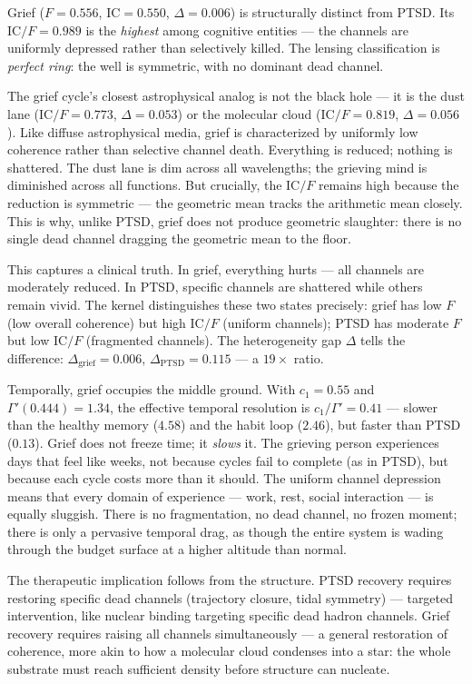 \documentclass[
  aps,
  prd,
  twocolumn,
  superscriptaddress,
  nofootinbib,
  floatfix
]{revtex4-2}
\newcommand{\Gam}{\Gamma}
\newcommand{\IC}{\mathrm{IC}}
\begin{document}
Grief ($F = 0.556$, $\IC = 0.550$, $\Delta = 0.006$) is
structurally distinct from PTSD.  Its $\IC/F = 0.989$ is
the \emph{highest} among cognitive entities --- the channels
are uniformly depressed rather than selectively killed.
The lensing classification is \emph{perfect ring}: the well
is symmetric, with no dominant dead channel.

The grief cycle's closest astrophysical analog is not
the black hole --- it is the dust lane ($\IC/F = 0.773$,
$\Delta = 0.053$) or the molecular cloud ($\IC/F = 0.819$,
$\Delta = 0.056$).  Like diffuse astrophysical media, grief
is characterized by uniformly low coherence rather than
selective channel death.  Everything is reduced;
nothing is shattered.  The dust lane is dim across all
wavelengths; the grieving mind is diminished across all functions.
But crucially, the $\IC/F$ remains high because the
reduction is symmetric --- the geometric mean tracks the
arithmetic mean closely.  This is why, unlike PTSD, grief
does not produce geometric slaughter: there is no single
dead channel dragging the geometric mean to the floor.

This captures a clinical truth.  In grief, everything hurts
--- all channels are moderately reduced.  In PTSD, specific
channels are shattered while others remain vivid.  The kernel
distinguishes these two states precisely: grief has low $F$
(low overall coherence) but high $\IC/F$ (uniform channels);
PTSD has moderate $F$ but low $\IC/F$ (fragmented channels).
The heterogeneity gap $\Delta$ tells the difference:
$\Delta_{\text{grief}} = 0.006$,
$\Delta_{\text{PTSD}} = 0.115$ --- a $19\times$ ratio.

Temporally, grief occupies the middle ground.  With $c_1 =
0.55$ and $\Gam'(0.444) = 1.34$, the effective temporal
resolution is $c_1/\Gam' = 0.41$ --- slower than the healthy
memory ($4.58$) and the habit loop ($2.46$), but faster than
PTSD ($0.13$).  Grief does not freeze time; it \emph{slows}
it.  The grieving person experiences days that feel like
weeks, not because cycles fail to complete (as in PTSD), but
because each cycle costs more than it should.  The uniform
channel depression means that every domain of experience ---
work, rest, social interaction --- is equally sluggish.
There is no fragmentation, no dead channel, no frozen moment;
there is only a pervasive temporal drag, as though the entire
system is wading through the budget surface at a higher
altitude than normal.

The therapeutic implication follows from the structure.
PTSD recovery requires restoring specific dead channels
(trajectory closure, tidal symmetry) --- targeted
intervention, like nuclear binding targeting specific
dead hadron channels.  Grief recovery requires raising all
channels simultaneously --- a general restoration of
coherence, more akin to how a molecular cloud condenses
into a star: the whole substrate must reach sufficient
density before structure can nucleate.
\end{document}
